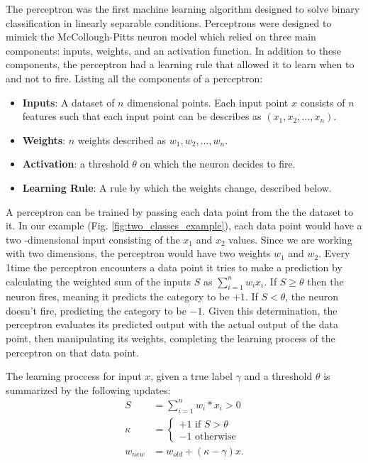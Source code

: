  The perceptron was the first machine learning algorithm designed to solve binary classification in linearly separable conditions. Perceptrons were designed to mimick the McCollough-Pitts neuron model which relied on three main components: inputs, weights, and an activation function. In addition to these components, the perceptron had a learning rule that allowed it to learn when to and not to fire. Listing all the components of a perceptron:
\begin{itemize}
  \item \textbf{Inputs}: A dataset of $n$ dimensional points. Each input point $x$ consists of $n$ features such that each input point can be describes as $(x_1, x_2, \dots, x_n)$.
  \item \textbf{Weights}: $n$ weights described as $w_1, w_2, \dots, w_n$.
  \item \textbf{Activation}: a threshold $\theta$ on which the neuron decides to fire.
  \item \textbf{Learning Rule}: A rule by which the weights change, described below.
\end{itemize}


A perceptron can be trained by passing each data point from the the dataset to it. In our example (Fig. \ref{fig:two_classes_example}), each data point would have a two -dimensional input consisting of the $x_1$ and $x_2$ values. Since we are working with two dimensions, the perceptron would have two weights $w_1$ and $w_2$. Every 1time the perceptron encounters a data point it tries to make a prediction by calculating the weighted sum of the inputs $S$  as $\sum_{i=1}^n w_ix_i$. If $S \geq \theta$ then the neuron fires, meaning it predicts the category to be $+1$. If $S < \theta$, the neuron doesn't fire, predicting the category to be $-1$. Given this determination, the perceptron evaluates its predicted output with the actual output of the data point, then manipulating its weights, completing the learning process of the perceptron on that data point. 

The learning proccess for input $x$, given a true label $\gamma$ and a threshold $\theta$ is summarized by the following updates:
\begin{align}
  S &= \sum_{i=1}^n w_i*x_i > 0  \\
  \kappa &= \begin{cases} 
    +1 \textrm{ if $S$} > \theta \\
    -1 \textrm{ otherwise} 
  \end{cases} \\
  w_{new} &= w_{old} + (\kappa - \gamma)x.
\end{align}

